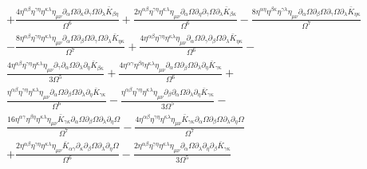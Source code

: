 \documentclass[10pt,letterpaper]{article}
\begin{document}
\begin{align}
& + \frac{4 \eta^{\alpha \beta} \eta^{\gamma \eta} \eta^{\kappa \lambda} \eta_{\mu \nu} \partial_{\alpha}\Omega \partial_{\kappa}\partial_{\gamma}\Omega \partial_{\lambda}\bar{K}_{\beta \eta}}{\Omega^6} + \frac{2 \eta^{\alpha \beta} \eta^{\gamma \eta} \eta^{\kappa \lambda} \eta_{\mu \nu} \partial_{\alpha}\Omega \partial_{\eta}\partial_{\gamma}\Omega \partial_{\lambda}\bar{K}_{\beta \kappa}}{\Omega^6} -  \frac{8 \eta^{\alpha \eta} \eta^{\beta \kappa} \eta^{\gamma \lambda} \eta_{\mu \nu} \partial_{\alpha}\Omega \partial_{\beta}\Omega \partial_{\gamma}\Omega \partial_{\lambda}\bar{K}_{\eta \kappa}}{\Omega^7} \nonumber \\
&-  \frac{8 \eta^{\alpha \beta} \eta^{\gamma \eta} \eta^{\kappa \lambda} \eta_{\mu \nu} \partial_{\alpha}\Omega \partial_{\beta}\Omega \partial_{\gamma}\Omega \partial_{\lambda}\bar{K}_{\eta \kappa}}{\Omega^7} + \frac{4 \eta^{\alpha \beta} \eta^{\gamma \eta} \eta^{\kappa \lambda} \eta_{\mu \nu} \partial_{\alpha}\Omega \partial_{\gamma}\partial_{\beta}\Omega \partial_{\lambda}\bar{K}_{\eta \kappa}}{\Omega^6} - \nonumber \\
& \frac{4 \eta^{\alpha \beta} \eta^{\gamma \eta} \eta^{\kappa \lambda} \eta_{\mu \nu} \partial_{\gamma}\partial_{\alpha}\Omega \partial_{\lambda}\partial_{\eta}\bar{K}_{\beta \kappa}}{3 \Omega^5} + \frac{4 \eta^{\alpha \gamma} \eta^{\beta \eta} \eta^{\kappa \lambda} \eta_{\mu \nu} \partial_{\alpha}\Omega \partial_{\beta}\Omega \partial_{\lambda}\partial_{\eta}\bar{K}_{\gamma \kappa}}{\Omega^6} + \nonumber \\
&\frac{\eta^{\alpha \beta} \eta^{\gamma \eta} \eta^{\kappa \lambda} \eta_{\mu \nu} \partial_{\alpha}\Omega \partial_{\beta}\Omega \partial_{\lambda}\partial_{\eta}\bar{K}_{\gamma \kappa}}{\Omega^6} -  \frac{\eta^{\alpha \beta} \eta^{\gamma \eta} \eta^{\kappa \lambda} \eta_{\mu \nu} \partial_{\beta}\partial_{\alpha}\Omega \partial_{\lambda}\partial_{\eta}\bar{K}_{\gamma \kappa}}{3 \Omega^5} - \nonumber \\
& \frac{16 \eta^{\alpha \gamma} \eta^{\beta \eta} \eta^{\kappa \lambda} \eta_{\mu \nu} \bar{K}_{\gamma \kappa} \partial_{\alpha}\Omega \partial_{\beta}\Omega \partial_{\lambda}\partial_{\eta}\Omega}{\Omega^7} -  \frac{4 \eta^{\alpha \beta} \eta^{\gamma \eta} \eta^{\kappa \lambda} \eta_{\mu \nu} \bar{K}_{\gamma \kappa} \partial_{\alpha}\Omega \partial_{\beta}\Omega \partial_{\lambda}\partial_{\eta}\Omega}{\Omega^7} \nonumber \\
&+ \frac{2 \eta^{\alpha \beta} \eta^{\gamma \eta} \eta^{\kappa \lambda} \eta_{\mu \nu} \bar{K}_{\alpha \gamma} \partial_{\kappa}\partial_{\beta}\Omega \partial_{\lambda}\partial_{\eta}\Omega}{\Omega^6} -  \frac{2 \eta^{\alpha \beta} \eta^{\gamma \eta} \eta^{\kappa \lambda} \eta_{\mu \nu} \partial_{\alpha}\Omega \partial_{\lambda}\partial_{\eta}\partial_{\beta}\bar{K}_{\gamma \kappa}}{3 \Omega^5}\nonumber \\

\end{align}
\end{document}
